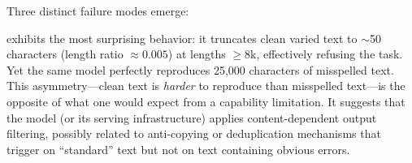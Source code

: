 \begin{table}[t]
    \centering
    \caption{Extreme-length reproduction results. \checkmark\ = exact match, \ = failure, \ = catastrophic failure (hallucination), --- = not tested. Length ratio (LR) and edit distance (ED) shown for failures.}
    \label{tab:extreme}
\end{table}

Three distinct failure modes emerge:

\gptfull exhibits the most surprising behavior: it truncates clean varied text to $\sim$50 characters (length ratio $\approx 0.005$) at lengths $\geq$8k, effectively refusing the task. Yet the same model perfectly reproduces 25,000 characters of misspelled text. This asymmetry---clean text is \emph{harder} to reproduce than misspelled text---is the opposite of what one would expect from a capability limitation. It suggests that the model (or its serving infrastructure) applies content-dependent output filtering, possibly related to anti-copying or deduplication mechanisms that trigger on ``standard'' text but not on text containing obvious errors.

